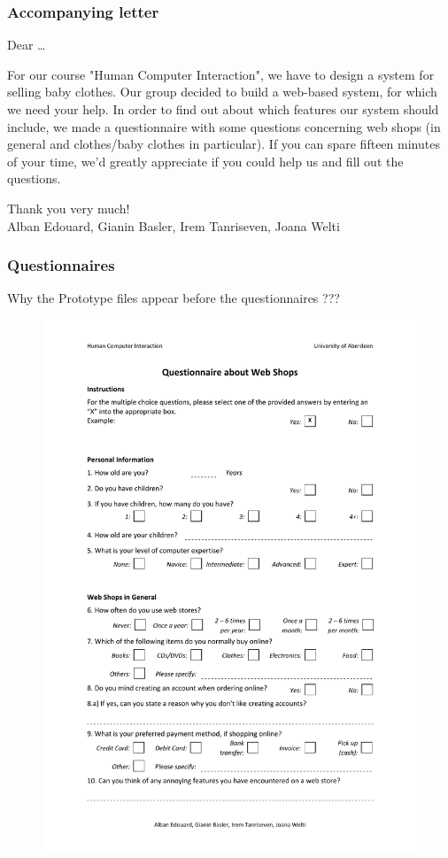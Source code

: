 \subsubsection{Accompanying letter}\label{sec:letter}
Dear \dots

For our course "Human Computer Interaction", we have to design a system for selling baby clothes. Our group decided to build a web-based system, for which we need your help. In order to find out about which features our system should include, we made a questionnaire with some questions concerning web shops (in general and clothes/baby clothes in particular).
If you can spare fifteen minutes of your time, we'd greatly appreciate if you could help us and fill out the questions.

Thank you very much!\\
Alban Edouard, Gianin Basler, Irem Tanriseven, Joana Welti


\subsubsection{Questionnaires}

Why the Prototype files appear before the questionnaires ???

\begin{figure}[ht!]
\centering
\includegraphics[width=1.0\textwidth]{User_Involvement_Methods/Questionnaires/Questionnaire_Web_Shops_v2.pdf}
\end{figure}

